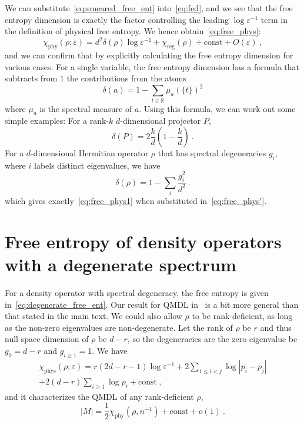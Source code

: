 \documentclass[aps,pre,twocolumn,superscriptaddress,amsmath,amssymb,reprint]{revtex4-2}
\def\eps{\varepsilon}
\begin{document}
We can substitute~\eqref{eq:smeared_free_ent} into~\eqref{eq:fed}, and we see that the free entropy dimension is exactly the factor controlling the leading $\log\eps^{-1}$ term in the definition of physical free entropy. We hence obtain~\eqref{eq:free_phys}:
\begin{equation}\label{eq:free_phys'}
    \chi_\mathrm{phy}(\rho;\eps)=d^2\delta(\rho)\log\eps^{-1} + \chi_\mathrm{reg}(\rho) + \mathrm{const} + O(\eps)\ ,
\end{equation}
and we can confirm that by explicitly calculating the free entropy dimension for various cases. For a single variable, the free entropy dimension has a formula that subtracts from $1$ the contributions from the atoms~\cite{voiculescu2002free}
\begin{equation}
    \delta(a)=1-\sum_{t\in\mathbb{R}} \mu_a(\{t\})^2
\end{equation}
where $\mu_a$ is the spectral measure of $a$. Using this formula, we can work out some simple examples: For a rank-$k$ $d$-dimensional projector $P$,
\begin{equation}\label{eq:proj_fed_ex}
    \delta(P)=2\frac{k}d\left(1-\frac{k}d\right)\ .
\end{equation}
For a $d$-dimensional Hermitian operator $\rho$ that has spectral degeneracies $g_i$, where $i$ labels distinct eigenvalues, we have
\begin{equation}\label{eq:fed_ex}
    \delta(\rho)=1 - \sum_i\frac{g_i^2}{d^2}\ .
\end{equation}
which gives exactly~\eqref{eq:free_phys1} when substituted in~\eqref{eq:free_phys'}.

\section{Free entropy of density operators with a degenerate spectrum}\label{sec:degeneracy}
For a density operator with spectral degeneracy, the free entropy is given in~\eqref{eq:degenerate_free_ent}. Our result for QMDL in~\cite{paper2} is a bit more general than that stated in the main text. We could also allow $\rho$ to be rank-deficient, as long as the non-zero eigenvalues are non-degenerate. Let the rank of $\rho$ be $r$ and thus null space dimension of $\rho$ be $d-r$, so the degeneracies are the zero eigenvalue be $g_0 = d-r$ and $g_{i\ge 1}= 1$. We have
\begin{multline}
    \chi_\mathrm{phys}(\rho;\eps) = r\left(2d-r-1\right)\log \eps^{-1}  + 2\sum_{1\le i<j}\log |p_i-p_j| \\ + 2(d-r)\sum_{i\ge 1}\log p_i + \mathrm{const} \ ,
\end{multline}
and it characterizes the QMDL of any rank-deficient $\rho$,
\begin{equation}
    |M| = \frac{1}{2}\chi_\mathrm{phy}(\rho,n^{-1}) + \mathrm{const} + o(1)\ .
\end{equation}
\end{document}
